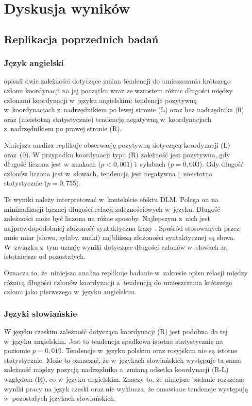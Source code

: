 \chapter{Dyskusja wyników} \label{ch6}

\section{Replikacja poprzednich badań}

\subsection{Język angielski}

\cite{przepiorkowski2023conjunct} opisali dwie zależności dotyczące zmian tendencji do umieszczania krótszego członu koordynacji na jej początku wraz ze wzrostem różnic długości między członami koordynacji w~języku angielskim: tendencje pozytywną w~koordynacjach z~nadrzędnikiem po lewej stronie (L) oraz bez nadrzędnika (0) oraz (nieistotną statystycznie) tendencję negatywną w~koordynacjach z~nadrzędnikiem po prawej stronie (R).

Niniejsza analiza replikuje obserwację pozytywną dotyczącą koordynacji (L) oraz~(0). W przypadku koordynacji typu (R) zależność jest pozytywna, gdy długość liczona jest w~znakach ($p<0{,}001$) i~sylabach ($p=0{,}003$).
Gdy długość członów liczona jest w~słowach, tendencja jest negatywna i~nieistotna statystycznie ($p=0{,}755$).

Te wyniki należy interpretować w~kontekście efektu DLM. Polega on na minimalizacji łącznej długości relacji zależnościowych w~języku. Długość zależności może być liczona na różne sposoby. Najlepszym z~nich jest najprawdopodobniej złożoność syntaktyczna frazy \citep{lohmann2014english}. Spośród stosowanych przez mnie miar (słowa, sylaby, znaki) najbliższą złożoności syntaktycznej są słowa. W~związku z~tym uznaję wyniki dotyczące długości członów w~słowach za istotniejsze od pozostałych.

Oznacza to, że~niniejsza analiza replikuje badanie \cite{przepiorkowski2023conjunct} w~zakresie opisu relacji między różnicą długości członów koordynacji a~tendencją do umieszczania krótszego członu jako pierwszego w~języku angielskim.

\subsection{Języki słowiańskie}

W języku czeskim zależność dotycząca koordynacji (R) jest podobna do tej w~języku angielskim. Jest to tendencja spadkowa istotna statystycznie na poziomie $p=0{,}019$. Tendencje w~języku polskim oraz rosyjskim nie są istotne statystycznie. Może to oznaczać, że w~językach słowiańskich występuje ta sama zależność między pozycją nadrzędnika a~zmianą odsetka koordynacji (R-L) względem (R), co w~języku angielskim. Znaczy to, że niniejsze badanie rozszerza wyniki pracy \cite{przepiorkowski2023conjunct} na język czeski oraz nie wyklucza, że omawiane tendencje występują w~pozostałych językach słowiańskich.

